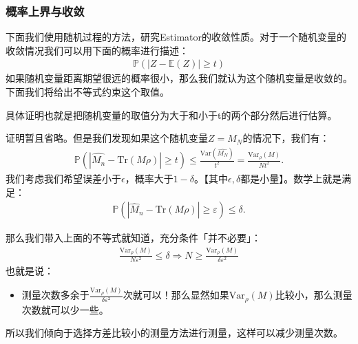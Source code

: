 \subsubsection{概率上界与收敛}

下面我们使用随机过程的方法，研究Estimator的收敛性质。对于一个随机变量的收敛情况我们可以用下面的概率进行描述：
\begin{align}
  \mathbb{P}(|Z-\mathbb{E}(Z)|\geq t)
\end{align}
如果随机变量距离期望很远的概率很小，那么我们就认为这个随机变量是收敛的。下面我们将给出不等式约束这个取值。

\bigskip
{}

具体证明也就是把随机变量的取值分为大于和小于t的两个部分然后进行估算。

\bigskip
{}

证明暂且省略。但是我们发现如果这个随机变量$ Z = M_N $的情况下，我们有：
\begin{align}
  \mathbb{P}{\left(\left|\hat{M_n}-\mathrm{Tr}(M\rho)\right|\geq
  t\right)}\leq\frac{\mathrm{Var}{\left(\hat{M_N}\right)}}{t^2}=\frac{\mathrm{Var}_\rho(M)}{Nt^2}.
\end{align}
我们考虑我们希望误差小于$ \epsilon $，概率大于$ 1-\delta $。【其中$ \epsilon, \delta $都是小量】。数学上就是满足：
\begin{align}
  \mathbb{P}{\left(\left|\hat{M}_n-\mathrm{Tr}(M\rho)\right|\geq\varepsilon\right)}\leq\delta.
\end{align}

那么我们带入上面的不等式就知道，充分条件「并不必要」：
\begin{align}
  \frac{\mathrm{Var}_\rho(M)}{N\varepsilon^2}\leq\delta\Longrightarrow
  N\geq\frac{\mathrm{Var}_\rho(M)}{\delta\varepsilon^2}
\end{align}
也就是说：
\begin{itemize}
  \item 测量次数多余于$
    \displaystyle\frac{\mathrm{Var}_\rho(M)}{\delta\varepsilon^2}
    $次就可以！那么显然如果$ \mathrm{Var}_\rho(M) $比较小，那么测量次数就可以少一些。
\end{itemize}
所以我们倾向于选择方差比较小的测量方法进行测量，这样可以减少测量次数。

